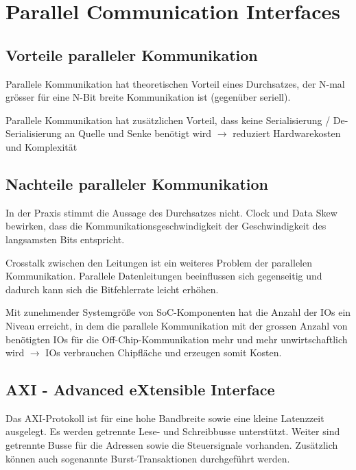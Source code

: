 \section{Parallel Communication Interfaces}
\subsection{Vorteile paralleler Kommunikation}
\begin{compactitem}
    \item Parallele Kommunikation hat theoretischen Vorteil eines Durchsatzes, der N-mal grösser für eine N-Bit breite Kommunikation ist (gegenüber seriell).
    \item Parallele Kommunikation hat zusätzlichen Vorteil, dass keine Serialisierung / De-Serialisierung an Quelle und Senke benötigt wird $\rightarrow$ reduziert Hardwarekosten und Komplexität
\end{compactitem}

\subsection{Nachteile paralleler Kommunikation}
\begin{compactitem}
    \item In der Praxis stimmt die Aussage des Durchsatzes nicht. Clock und Data Skew bewirken, dass die Kommunikationsgeschwindigkeit der Geschwindigkeit des langsamsten Bits entspricht.
    \item Crosstalk zwischen den Leitungen ist ein weiteres Problem der parallelen Kommunikation. Parallele Datenleitungen beeinflussen sich gegenseitig und dadurch kann sich die Bitfehlerrate leicht erhöhen.
    \item Mit zunehmender Systemgröße von SoC-Komponenten hat die Anzahl der IOs ein Niveau erreicht, in dem die parallele Kommunikation mit der grossen Anzahl von benötigten IOs für die Off-Chip-Kommunikation mehr und mehr unwirtschaftlich wird $\rightarrow$ IOs verbrauchen Chipfläche und erzeugen somit Kosten.
\end{compactitem}

\subsection{AXI - Advanced eXtensible Interface}
Das AXI-Protokoll ist für eine hohe Bandbreite sowie eine kleine Latenzzeit ausgelegt. Es werden getrennte Lese- und Schreibbusse unterstützt. Weiter sind getrennte Busse für die Adressen sowie die Steuersignale vorhanden. Zusätzlich können auch sogenannte Burst-Transaktionen durchgeführt werden.

